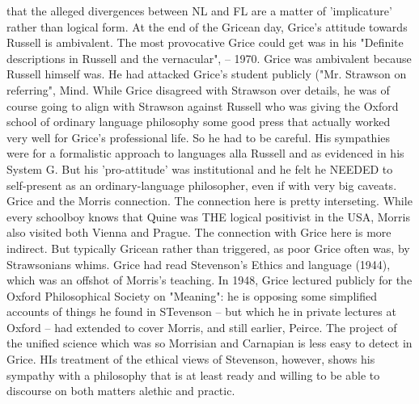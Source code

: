 \documentclass[10pt,titlepage]{book}
\begin{document}
{that the alleged  divergences between NL and FL are a matter of 
'implicature' rather than logical  form.  At the end of the Gricean  day, Grice's  
attitude towards Russell is ambivalent. The most  provocative Grice could  get 
was in his "Definite descriptions in Russell and the  
vernacular",  -- 1970. Grice was ambivalent because Russell himself was. He 
had attacked  Grice's student publicly ("Mr. Strawson on referring", Mind.  
While Grice  disagreed with Strawson over details, he was of course going 
to  align with  Strawson against Russell who was giving the Oxford school of 
ordinary   language philosophy some good press that actually worked very 
well for  Grice's  professional life. So he had to be careful. His sympathies 
were  for a  formalistic approach to languages alla Russell and as evidenced 
in  his System  G. But his 'pro-attitude' was institutional and he felt he  
NEEDED to  self-present as an ordinary-language philosopher, even if with  
very big  caveats. 
Grice  and the Morris connection. The connection here is pretty 
interseting. While  every schoolboy knows that Quine was THE logical positivist in the 
USA, Morris  also visited both Vienna and Prague. The connection with Grice 
here is more  indirect. But typically Gricean rather than triggered, as poor 
Grice often was,  by Strawsonians whims. Grice had read Stevenson's Ethics 
and language (1944),  which was an offshot of Morris's teaching. In 1948, 
Grice lectured publicly for  the Oxford Philosophical Society on "Meaning": he 
is opposing some simplified  accounts of things he found in STevenson -- 
but which he in private lectures at  Oxford --  had extended to cover Morris, 
and still earlier, Peirce. The  project of the unified science which was so 
Morrisian and Carnapian is less easy  to detect in Grice. HIs treatment of 
the ethical views of Stevenson, however,  shows his sympathy with a 
philosophy that is at least ready and willing to be  able to discourse on both 
matters alethic and practic. 

}
\end{document}
